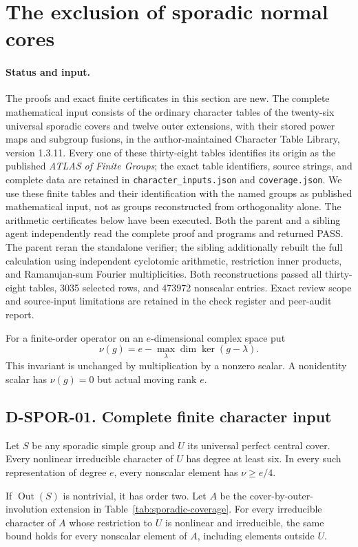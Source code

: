 \section{The exclusion of sporadic normal cores}
\label{sec:sporadic-core}

\paragraph{Status and input.}
The proofs and exact finite certificates in this section are new.
The complete mathematical input consists of the ordinary character
tables of the twenty-six universal sporadic covers and twelve outer
extensions, with their stored power maps and subgroup fusions, in
the author-maintained Character Table Library, version 1.3.11.
Every one of these thirty-eight tables identifies its origin as the
published \emph{ATLAS of Finite Groups}; the exact table identifiers,
source strings, and complete data are retained in
\texttt{character\_inputs.json} and \texttt{coverage.json}.
We use these finite tables and their identification with the named
groups as published mathematical input, not as groups reconstructed
from orthogonality alone.  The arithmetic certificates below have
been executed.  Both the parent and a sibling agent independently
read the complete proof and programs and returned PASS.  The parent
reran the standalone verifier; the sibling additionally rebuilt the
full calculation using independent cyclotomic arithmetic, restriction
inner products, and Ramanujan-sum Fourier multiplicities.  Both
reconstructions passed all thirty-eight tables, 3035 selected rows,
and 473972 nonscalar entries.  Exact review scope and source-input
limitations are retained in the check register and peer-audit report.

For a finite-order operator on an $e$-dimensional complex space put
\[
 \nu(g)=e-\max_\lambda\dim\ker(g-\lambda).
\]
This invariant is unchanged by multiplication by a nonzero scalar.
A nonidentity scalar has $\nu(g)=0$ but actual moving rank $e$.

\subsection*{D-SPOR-01. Complete finite character input}

\begin{lemma}\label{D-SPOR-01}
Let $S$ be any sporadic simple group and $U$ its universal perfect
central cover.  Every nonlinear irreducible character of $U$ has
degree at least six.  In every such representation of degree $e$,
every nonscalar element has $\nu\ge e/4$.

If $\operatorname{Out}(S)$ is nontrivial, it has order two.  Let
$A$ be the cover-by-outer-involution extension in Table~\ref{tab:sporadic-coverage}.
For every irreducible character of $A$ whose restriction to $U$ is
nonlinear and irreducible, the same bound holds for every nonscalar
element of $A$, including elements outside $U$.
\end{lemma}

